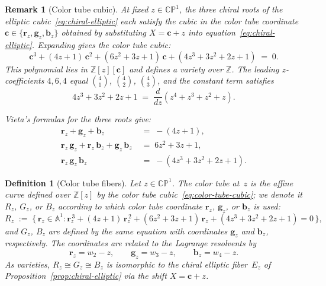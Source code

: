 \documentclass[12pt,a4paper]{report}
\newtheorem{definition}[theorem]{Definition}
\newtheorem{remark}[theorem]{Remark}
\begin{document}
\begin{remark}[Color tube cubic]
\label{rem:color-tube-cubic}
  At fixed $z \in \mathbb{CP}^1$, the three chiral roots of the
  elliptic cubic~\eqref{eq:chiral-elliptic} each satisfy the cubic in
  the color tube coordinate $\mathbf{c} \in \{\mathbf{r}_z, \mathbf{g}_z, \mathbf{b}_z\}$
  obtained by substituting $X = \mathbf{c} + z$
  into equation~\eqref{eq:chiral-elliptic}.  Expanding gives the
  \emph{color tube cubic}:
  \begin{equation}\label{eq:color-tube-cubic}
    \mathbf{c}^3 + (4z+1)\,\mathbf{c}^2 + (6z^2+3z+1)\,\mathbf{c}
    + (4z^3+3z^2+2z+1) \;=\; 0.
  \end{equation}
  This polynomial lies in $\mathbb{Z}[z][\mathbf{c}]$ and defines a
  variety over $\mathbb{Z}$.  The leading $z$-coefficients $4, 6, 4$
  equal $\binom{4}{1}$, $\binom{4}{2}$, $\binom{4}{3}$, and the
  constant term satisfies
  \[
    4z^3 + 3z^2 + 2z + 1 \;=\; \frac{d}{dz}(z^4 + z^3 + z^2 + z).
  \]

  \medskip
  \noindent Vieta's formulas for the three roots give:
  \begin{align}
    \mathbf{r}_z + \mathbf{g}_z + \mathbf{b}_z
      &\;=\; -(4z+1),
      \label{eq:vieta-sum}\\[4pt]
    \mathbf{r}_z\,\mathbf{g}_z + \mathbf{r}_z\,\mathbf{b}_z
      + \mathbf{g}_z\,\mathbf{b}_z
      &\;=\; 6z^2+3z+1,
      \label{eq:vieta-pairs}\\[4pt]
    \mathbf{r}_z\,\mathbf{g}_z\,\mathbf{b}_z
      &\;=\; -(4z^3+3z^2+2z+1).
      \label{eq:vieta-product}
  \end{align}
\end{remark}

\begin{definition}[Color tube fibers]
\label{def:color-tube-fibers}
  Let $z \in \mathbb{CP}^1$.  The \emph{color tube} at~$z$ is the
  affine curve defined over $\mathbb{Z}[z]$ by the color tube
  cubic~\eqref{eq:color-tube-cubic}; we denote it $R_z$, $G_z$, or
  $B_z$ according to which color tube coordinate $\mathbf{r}_z$,
  $\mathbf{g}_z$, or $\mathbf{b}_z$ is used:
  \begin{equation}\label{eq:color-tube-fiber-def}
    R_z \;:=\;
    \bigl\{\,\mathbf{r}_z \in \mathbb{A}^1 :
      \mathbf{r}_z^{\,3} + (4z+1)\,\mathbf{r}_z^{\,2}
      + (6z^2+3z+1)\,\mathbf{r}_z
      + (4z^3+3z^2+2z+1) = 0\,\bigr\},
  \end{equation}
  and $G_z$, $B_z$ are defined by the same equation with coordinates
  $\mathbf{g}_z$ and $\mathbf{b}_z$, respectively.  The coordinates
  are related to the Lagrange resolvents by
  \[
    \mathbf{r}_z = w_2 - z, \qquad \mathbf{g}_z = w_3 - z, \qquad
    \mathbf{b}_z = w_4 - z.
  \]
  As varieties, $R_z \cong G_z \cong B_z$ is isomorphic to the chiral
  elliptic fiber~$E_z$ of Proposition~\ref{prop:chiral-elliptic} via
  the shift $X = \mathbf{c} + z$.
\end{definition}
\end{document}

